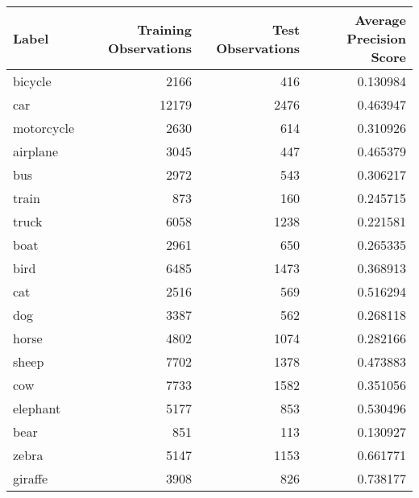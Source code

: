\begin{tabular}{lrrr}
\toprule
      Label &  Training Observations &  Test Observations &  Average Precision Score \\
\midrule
    bicycle &                   2166 &                416 &                 0.130984 \\
        car &                  12179 &               2476 &                 0.463947 \\
 motorcycle &                   2630 &                614 &                 0.310926 \\
   airplane &                   3045 &                447 &                 0.465379 \\
        bus &                   2972 &                543 &                 0.306217 \\
      train &                    873 &                160 &                 0.245715 \\
      truck &                   6058 &               1238 &                 0.221581 \\
       boat &                   2961 &                650 &                 0.265335 \\
       bird &                   6485 &               1473 &                 0.368913 \\
        cat &                   2516 &                569 &                 0.516294 \\
        dog &                   3387 &                562 &                 0.268118 \\
      horse &                   4802 &               1074 &                 0.282166 \\
      sheep &                   7702 &               1378 &                 0.473883 \\
        cow &                   7733 &               1582 &                 0.351056 \\
   elephant &                   5177 &                853 &                 0.530496 \\
       bear &                    851 &                113 &                 0.130927 \\
      zebra &                   5147 &               1153 &                 0.661771 \\
    giraffe &                   3908 &                826 &                 0.738177 \\
\bottomrule
\end{tabular}
